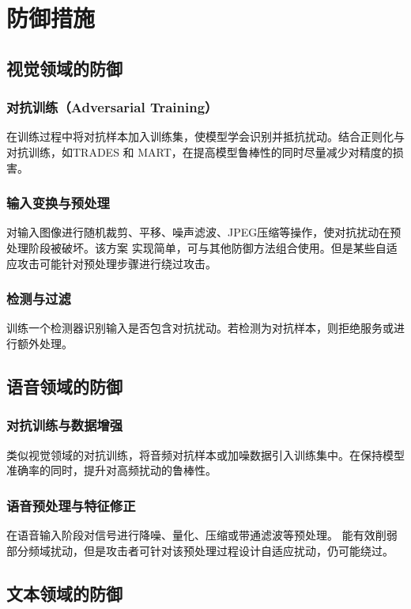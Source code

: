 \documentclass[main]{IEEEtran}
\begin{document}
\section{防御措施}
\songti
\subsection{视觉领域的防御}
\subsubsection{对抗训练（Adversarial Training）}
在训练过程中将对抗样本加入训练集，使模型学会识别并抵抗扰动\cite{madry2018towards}。结合正则化与对抗训练，如TRADES\cite{zhang2019theoretically} 和 MART\cite{wang2020improving}，在提高模型鲁棒性的同时尽量减少对精度的损害。
\subsubsection{输入变换与预处理}对输入图像进行随机裁剪、平移、噪声滤波、JPEG压缩等操作，使对抗扰动在预处理阶段被破坏\cite{xie2018mitigating, mustafa2019image}。该方案 实现简单，可与其他防御方法组合使用。但是某些自适应攻击可能针对预处理步骤进行绕过攻击。
\subsubsection{检测与过滤}
训练一个检测器识别输入是否包含对抗扰动\cite{metzen2017detecting}。若检测为对抗样本，则拒绝服务或进行额外处理。

\subsection{语音领域的防御}
\subsubsection{对抗训练与数据增强}
类似视觉领域的对抗训练，将音频对抗样本或加噪数据引入训练集中\cite{subramanian2019adversarial}。在保持模型准确率的同时，提升对高频扰动的鲁棒性。
\subsubsection{语音预处理与特征修正}
在语音输入阶段对信号进行降噪、量化、压缩或带通滤波等预处理\cite{yang2021analyzing}。 能有效削弱部分频域扰动，但是攻击者可针对该预处理过程设计自适应扰动，仍可能绕过。

\subsection{文本领域的防御}
\end{document}

